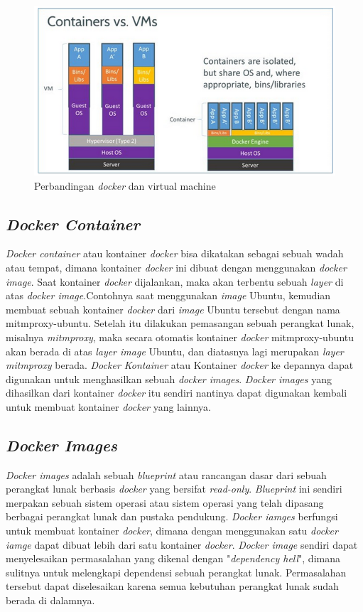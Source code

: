 	\begin{figure}[H] %
	\centering
	\includegraphics[width=\linewidth]{images/bab2/docker-vm-container}
	\caption{Perbandingan \textit{docker} dan virtual machine}
	\label{contohDocker}
	\end{figure}
	
	\subsection{\textit{Docker Container}}
	\textit{Docker container} atau kontainer \textit{docker} bisa dikatakan sebagai sebuah wadah atau tempat, dimana kontainer \textit{docker} ini dibuat dengan menggunakan \textit{docker image}. Saat kontainer \textit{docker} dijalankan, maka akan terbentu sebuah \textit{layer} di atas \textit{docker image}.Contohnya saat menggunakan \textit{image} Ubuntu, kemudian membuat sebuah kontainer \textit{docker} dari \textit{image} Ubuntu tersebut dengan nama mitmproxy-ubuntu. Setelah itu dilakukan pemasangan sebuah perangkat lunak, misalnya \textit{mitmproxy}, maka secara otomatis kontainer \textit{docker} mitmproxy-ubuntu akan berada di atas \textit{layer image} Ubuntu, dan diatasnya lagi merupakan \textit{layer mitmproxy} berada. \textit{Docker Kontainer} atau Kontainer \textit{docker} ke depannya dapat digunakan untuk menghasilkan sebuah \textit{docker images}. \textit{Docker images} yang dihasilkan dari kontainer \textit{docker} itu sendiri nantinya dapat digunakan kembali untuk membuat kontainer \textit{docker} yang lainnya.
	
	\subsection{\textit{Docker Images}}
	\textit{Docker images} adalah sebuah \textit{blueprint} atau rancangan dasar dari sebuah perangkat lunak berbasis \textit{docker} yang bersifat \textit{read-only}. \textit{Blueprint} ini sendiri merpakan sebuah sistem operasi atau sistem operasi yang telah dipasang berbagai perangkat lunak dan pustaka pendukung. \textit{Docker iamges} berfungsi untuk membuat kontainer \textit{docker}, dimana dengan menggunakan satu \textit{docker iamge} dapat dibuat lebih dari satu kontainer \textit{docker}. \textit{Docker image} sendiri dapat menyelesaikan permasalahan yang dikenal dengan "\textit{dependency hell}", dimana sulitnya untuk melengkapi dependensi sebuah perangkat lunak. Permasalahan tersebut dapat diselesaikan karena semua kebutuhan perangkat lunak sudah berada di dalamnya.
	
